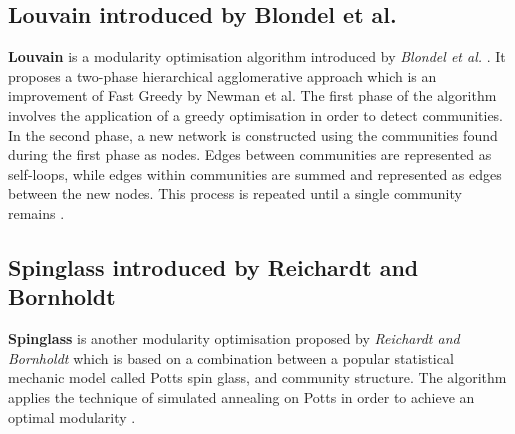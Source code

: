\iffalse
\subsection{Clustering Coefficient}

The clustering coefficient algorithm is used to identify clustering in a network. It is a numerical value between 0 and 1, with 0 indicating no clustering and 1 indicating high clustering. Clustering within a network occurs when nodes group together through a high proportion of 10 edges between them. The clustering coefficient is commonly identified by searching for triangles. In a highly clustered network, when two edges have a common node, there is probably a third edge and the three edges form a triangle. This study uses the algorithm to determine if the network is a small-world network. Alongside a high clustering coefficient, a small average path length indicates that a network is in fact a small-world network.
\fi

\subsection{Louvain introduced by Blondel et al.}

\textbf{Louvain} is a modularity optimisation algorithm introduced by \textit{Blondel et al.} \cite{blondel2008fast}. It proposes a two-phase hierarchical agglomerative approach which is an improvement of Fast Greedy by Newman et al. \cite{newman2004fast} The first phase of the algorithm involves the application of a greedy optimisation in order to detect communities. In the second phase, a new network is constructed using the communities found during the first phase as nodes. Edges between communities are represented as self-loops, while edges within communities are summed and represented as edges between the new nodes. This process is repeated until a single community remains \cite{orman2011accuracy}.

\subsection{Spinglass introduced by Reichardt and Bornholdt}

\textbf{Spinglass} is another modularity optimisation proposed by \textit{Reichardt and Bornholdt} \cite{reichardt2006statistical} which is based on a combination between a popular statistical mechanic model called Potts spin glass, and community structure. The algorithm applies the technique of simulated annealing on Potts in order to achieve an optimal modularity \cite{orman2011accuracy}.

